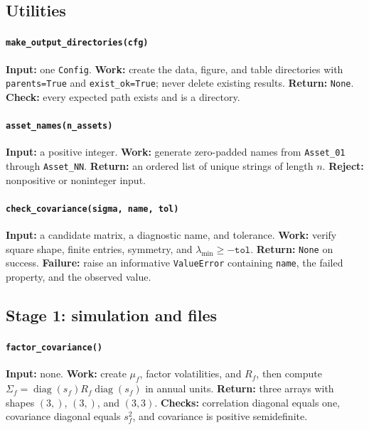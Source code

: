 \documentclass[10pt]{article}
\newcommand{\diag}{\operatorname{diag}}
\begin{document}
\begin{sloppypar}
\subsection*{Utilities}

\paragraph{\texttt{make\_output\_directories(cfg)}}
\textbf{Input:} one \texttt{Config}. \textbf{Work:} create the data, figure, and
table directories with \texttt{parents=True} and \texttt{exist\_ok=True};
never delete existing results. \textbf{Return:} \texttt{None}.
\textbf{Check:} every expected path exists and is a directory.

\paragraph{\texttt{asset\_names(n\_assets)}}
\textbf{Input:} a positive integer. \textbf{Work:} generate zero-padded names
from \texttt{Asset\_01} through \texttt{Asset\_NN}.
\textbf{Return:} an ordered list of unique strings of length $n$.
\textbf{Reject:} nonpositive or noninteger input.

\paragraph{\texttt{check\_covariance(sigma, name, tol)}}
\textbf{Input:} a candidate matrix, a diagnostic name, and tolerance.
\textbf{Work:} verify square shape, finite entries, symmetry, and
$\lambda_{\min}\geq-\texttt{tol}$. \textbf{Return:} \texttt{None} on success.
\textbf{Failure:} raise an informative \texttt{ValueError} containing
\texttt{name}, the failed property, and the observed value.

\subsection*{Stage 1: simulation and files}

\paragraph{\texttt{factor\_covariance()}}
\textbf{Input:} none. \textbf{Work:} create $\mu_f$, factor volatilities, and
$R_f$, then compute
$\Sigma_f=\diag(s_f)R_f\diag(s_f)$ in annual units.
\textbf{Return:} three arrays with shapes $(3,)$, $(3,)$, and $(3,3)$.
\textbf{Checks:} correlation diagonal equals one, covariance diagonal equals
$s_f^2$, and covariance is positive semidefinite.


\end{sloppypar}
\end{document}
